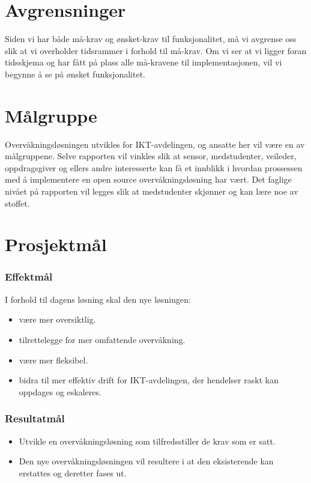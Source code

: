 \section{Avgrensninger}
Siden vi har både må-krav og ønsket-krav til funksjonalitet, må vi avgrense oss slik at vi overholder tidsrammer i forhold til må-krav. Om vi ser at vi ligger foran tidsskjema og har fått på plass alle må-kravene til implementasjonen, vil vi begynne å se på ønsket funksjonalitet.

\section{Målgruppe}
Overvåkningsløsningen utvikles for IKT-avdelingen, og ansatte her vil være en av målgruppene. Selve rapporten vil vinkles slik at sensor, medstudenter, veileder, oppdragsgiver og ellers andre interesserte kan få et innblikk i hvordan prossessen med å implementere en open source overvåkningsløsning har vært. Det faglige nivået på rapporten vil legges slik at medstudenter skjønner og kan lære noe av stoffet.

\section{Prosjektmål}
\subsubsection{Effektmål}
I forhold til dagens løsning skal den nye løsningen:
\begin{itemize}
	\item være mer oversiktlig.
	\item tilrettelegge for mer omfattende overvåkning.
	\item være mer fleksibel.
	\item bidra til mer effektiv drift for IKT-avdelingen, der hendelser raskt kan oppdages og eskaleres.
\end{itemize}

\subsubsection{Resultatmål}
\begin{itemize}
	\item Utvikle en overvåkningsløsning som tilfredsstiller de krav som er satt.
	\item Den nye overvåkningsløsningen vil resultere i at den eksisterende kan erstattes og deretter fases ut.
\end{itemize}

